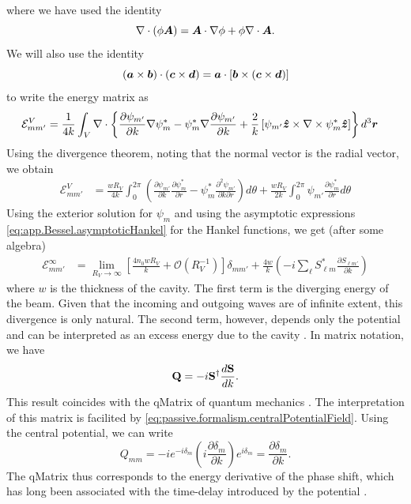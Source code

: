 where we have used the identity \cite[Appendix II]{STR41}
  \begin{equation}
    \nabla\cdot\left(\phi\boldsymbol{A}\right) = \boldsymbol{A}\cdot\nabla\phi+\phi\nabla\cdot\boldsymbol{A}.
  \end{equation}
We will also use the
identity
  \begin{equation}
    (\boldsymbol{a}\times\boldsymbol{b})\cdot(\boldsymbol{c}\times\boldsymbol{d}) = \boldsymbol{a}\cdot\left[\boldsymbol{b}\times(\boldsymbol{c}\times\boldsymbol{d})\right]
  \end{equation}
to write the energy matrix as
  \begin{align}
    \mathcal{E}^V_{mm'} &= \frac{1}{4k}\int_V\nabla\cdot
			    \left\{
			      \frac{\partial\psi_{m'}}{\partial k}\nabla\psi^*_{m}-\psi^*_m\nabla\frac{\partial\psi_{m'}}{\partial k}
			+   \frac{2}{k}\left[\psi_{m'}\boldsymbol{\hat{z}}\times\nabla\times\psi^*_m\boldsymbol{\hat{z}}\right]\right\}d^3\boldsymbol{r}
  \end{align}
Using the divergence theorem, noting that the normal vector
is the radial vector, we obtain
  \begin{align}
    \mathcal{E}^V_{mm'}	&= \frac{wR_V}{4k}
			  \int_0^{2\pi}\left(\frac{\partial\psi_{m'}}{\partial k}\frac{\partial\psi^*_m}{\partial r}
					      -\psi^*_m\frac{\partial^2\psi_{m'}}{\partial k\partial r}\right)d\theta	\nonumber
			+\frac{wR_V}{2k}
			  \int_0^{2\pi}\psi_{m'}\frac{\partial\psi^*_m}{\partial r} d\theta
  \end{align}
Using the exterior solution for $\psi_m$ and using the 
asymptotic expressions \eqref{eq:app.Bessel.asymptoticHankel} for the Hankel functions, we get
(after some algebra)
  \begin{align}
   \mathcal{E}^{\infty}_{mm'} &= \lim_{R_V\rightarrow\infty}\left[\frac{4n_0wR_V}{k}+\mathcal{O}(R_V^{-1})\right]\delta_{mm'}
			      + \frac{4w}{k}\left(-i\sum_\ell S^*_{\ell m}\frac{\partial S_{\ell m'}}{\partial k}\right)
  \end{align}
where $w$ is the thickness of the cavity. The first term is the 
diverging energy of the beam. Given that the incoming 
and outgoing waves are of infinite extent, this divergence
is only natural. The second term, however, depends only the
potential and can be interpreted as an excess energy due to the
cavity \cite{GAP2013}. In matrix notation, we have
  \begin{equation}
    \mathbf{Q} = -i\mathbf{S}^\dagger\frac{d\mathbf{S}}{dk}.
  \end{equation}
This result coincides with the \gls{qMatrix} of quantum 
mechanics \cite{SMI1960}. The interpretation of this 
matrix is facilited by \eqref{eq:passive.formalism.centralPotentialField}. 
Using the central potential, we can write
  \begin{equation}
    Q_{mm} = -ie^{-i\delta_m}\left(i\frac{\partial\delta_m}{\partial k}\right)e^{i\delta_m} = \frac{\partial\delta_m}{\partial k}.
  \end{equation}
The \gls{qMatrix} thus corresponds to the energy derivative of the 
phase shift, which has long been associated with the time-delay
introduced by the potential \cite{EIS1948,SMI1960,CAR2002}. 

